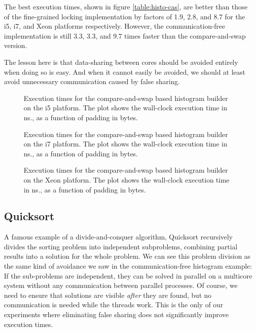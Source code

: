The best execution times, shown in figure \ref{table:histo-cas}, are 
better than those of the fine-grained locking implementation by factors of 1.9,
2.8, and 8.7 for the i5, i7, and Xeon platforms respectively. However, the
communication-free implementation is still 3.3, 3.3, and 9.7 times faster than
the compare-and-swap version.

The lesson here is that data-sharing between cores should be avoided
entirely when doing so is easy. And when it cannot easily be avoided, we
should at least avoid unnecessary communication caused by false sharing.

\begin{figure}[hbpt]
\graphicspath{{plots/}}

\caption{Execution times for the compare-and-swap based histogram builder on the i5 platform. The plot shows the
	wall-clock execution time in ns., as a function of padding in bytes.}
\label{fig:histo-cas-i5}
\end{figure}

\begin{figure}[hbpt]
\graphicspath{{plots/}}

\caption{Execution times for the compare-and-swap based histogram builder on the i7 platform. The plot shows the
	wall-clock execution time in ns., as a function of padding in bytes.}
	\label{fig:histo-cas-i7}
\end{figure}

\begin{figure}[hbpt]
\graphicspath{{plots/}}

\caption{Execution times for the compare-and-swap based histogram builder on the Xeon platform. The plot shows the
	wall-clock execution time in ns., as a function of padding in bytes.}
	\label{fig:histo-cas-xeon}
\end{figure}

\subsection{Quicksort}
A famous example of a divide-and-conquer algorithm, Quicksort recursively
divides the sorting problem into independent subproblems, combining partial
results into a solution for the whole problem. We can see this problem division
as the same kind of avoidance we saw in the communication-free histogram
example: If the sub-problems are independent, they can be solved in parallel on
a multicore system without any communication between parallel processes. Of
course, we need to ensure that solutions are visible \textit{after} they are
found, but no communication is needed while the threads work. This is the only
of our experiments where eliminating false sharing does not significantly
improve execution times.

